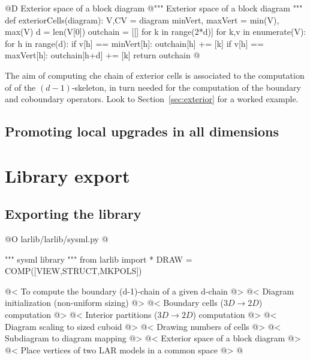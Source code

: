 \documentclass[11pt,oneside]{article}	%
\begin{document}
@D Exterior space of a block diagram
@{""" Exterior space of a block diagram """
def exteriorCells(diagram):
	V,CV = diagram
	minVert, maxVert = min(V), max(V)
	d = len(V[0])
	outchain = [[] for k in range(2*d)]
	for k,v in enumerate(V):
		for h in range(d):
			if v[h] == minVert[h]: outchain[h] += [k]
			if v[h] == maxVert[h]: outchain[h+d] += [k]
	return outchain
@}

The aim of computing che chain of exterior cells is associated to the computation of 
of the $(d-1)$-skeleton, in turn needed for the computation of the boundary and coboundary operators.
Look to Section~\ref{sec:exterior} for a worked example.



\subsection{Promoting local upgrades in all dimensions}



\section{Library export}
\subsection{Exporting the library}

@O larlib/larlib/sysml.py
@{""" sysml library """
from larlib import *
DRAW = COMP([VIEW,STRUCT,MKPOLS])

@< To compute the boundary (d-1)-chain of a given d-chain @>
@< Diagram initialization (non-uniform sizing) @>
@< Boundary cells ($3D\to 2D$) computation @>
@< Interior partitions ($3D\to 2D$) computation @>
@< Diagram scaling to sized cuboid @>
@< Drawing numbers of cells @>
@< Subdiagram to diagram mapping @>
@< Exterior space of a block diagram @>
@< Place vertices of two LAR models in a common space @>
@}
\end{document}

